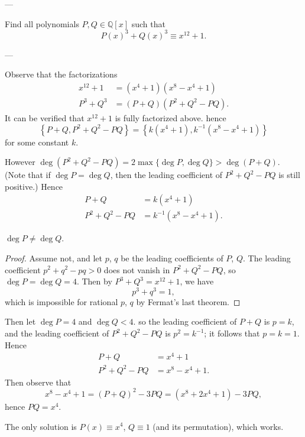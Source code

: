 
---

Find all polynomials $P,Q\in\mathbb Q[x]$ such that
\[P(x)^3+Q(x)^3\equiv x^{12}+1.\]

---

Observe that the factorizations
\begin{align*}
    x^{12}+1&=\left(x^4+1\right)\left(x^8-x^4+1\right)\\
    P^3+Q^3&=(P+Q)\left(P^2+Q^2-PQ\right).
\end{align*}
It can be verified that $x^{12}+1$ is fully factorized above. hence
\[\left\{P+Q,P^2+Q^2-PQ\right\}=\left\{k\left(x^4+1\right),k^{-1}\left(x^8-x^4+1\right)\right\}\]
for some constant $k$.

However $\deg(P^2+Q^2-PQ)=2\max\{\deg P,\deg Q\}>\deg(P+Q)$. (Note that if $\deg P=\deg Q$, then the leading coefficient of $P^2+Q^2-PQ$ is still positive.) Hence
\begin{align*}
    P+Q&=k\left(x^4+1\right)\\
    P^2+Q^2-PQ&=k^{-1}\left(x^8-x^4+1\right).
\end{align*}

\begin{claim*}
    $\deg P\ne\deg Q$.
\end{claim*}
\begin{proof}
    Assume not, and let $p$, $q$ be the leading coefficients of $P$, $Q$. The leading coefficient $p^2+q^2-pq>0$ does not vanish in $P^2+Q^2-PQ$, so $\deg P=\deg Q=4$. Then by $P^3+Q^3=x^{12}+1$, we have
    \[p^3+q^3=1,\]
    which is impossible for rational $p$, $q$ by Fermat's last theorem.
\end{proof}

Then let $\deg P=4$ and $\deg Q<4$. so the leading coefficient of $P+Q$ is $p=k$, and the leading coefficient of $P^2+Q^2-PQ$ is $p^2=k^{-1}$; it follows that $p=k=1$. Hence
\begin{align*}
    P+Q&=x^4+1\\
    P^2+Q^2-PQ&=x^8-x^4+1.
\end{align*}
Then observe that
\[x^8-x^4+1=(P+Q)^2-3PQ=\left(x^8+2x^4+1\right)-3PQ,\]
hence $PQ=x^4$.

The only solution is $P(x)\equiv x^4$, $Q\equiv1$ (and its permutation), which works.

